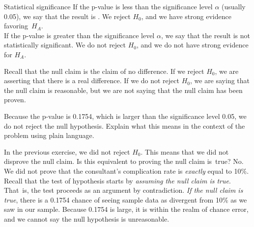 \begin{onebox}{Statistical significance}
If the p-value is less than the significance level $\alpha$ (usually 0.05), we say that the result is . We reject $H_0$, and we have strong evidence favoring~$H_A$. \\[2mm]
If the p-value is greater than the significance level $\alpha$, we say that the result is not statistically significant. We do not reject $H_0$, and we do not have strong evidence for $H_A$.\end{onebox}

Recall that the null claim is the claim of no difference. If we reject $H_0$, we are asserting that there is a real difference. If we do not reject $H_0$, we are saying that the null claim is reasonable, but we are not saying that the null claim has been proven.

\begin{exercisewrap}
\begin{nexercise} \label{plainLanguageExplanationOfHTConclusionForLiverDonorSurgicalConsultant}
Because the p-value is 0.1754, which is larger than the significance level 0.05, we do not reject the null hypothesis. Explain what this means in the context of the problem using plain language.\footnotemark
\end{nexercise}
\end{exercisewrap}

\begin{examplewrap}
\begin{nexample}{In the previous exercise, we did not reject $H_0$. This means that we did not disprove the null claim. Is this equivalent to proving the null claim is~true?}
No. We did not prove that the consultant's complication rate is \emph{exactly} equal to 10\%. Recall that the test of hypothesis starts by \emph{assuming the null claim is true}. That~is, the test proceeds as an argument by contradiction. \emph{If the null claim is true}, there is a 0.1754 chance of seeing sample data as divergent from 10\% as we saw in our sample. Because 0.1754 is large, it is within the realm of chance error, and we cannot say the null hypothesis is unreasonable.\footnotemark
\end{nexample}
\end{examplewrap}


